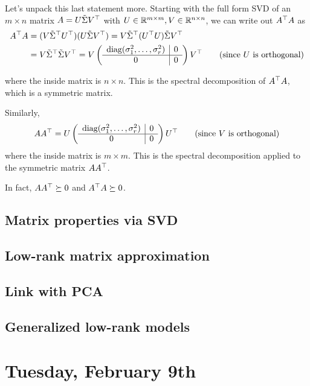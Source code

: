 \documentclass[11 pt]{scrartcl}
\begin{document}
Let's unpack this last statement more. 
Starting with the full form SVD of an $m\times n$ matrix $A = U \tilde{\Sigma} V^\top$ with $U\in \mathbb R^{m\times m}, V\in\mathbb R^{n\times n}$, we can write out $A^\top A$ as 
\begin{align*}
    A^\top A &= (V \tilde{\Sigma}^\top U^\top) (U \tilde{\Sigma} V^\top) =  V \tilde{\Sigma}^\top (U^\top U) \tilde{\Sigma} V^\top \\ 
           &= V\tilde{\Sigma}^\top \tilde{\Sigma} V^\top = V \left(\begin{array}{c|c} \text{diag}(\sigma_1^2, \dots, \sigma_r^2) & 0 \\ \hline 0 & 0 \end{array}\right) V^\top \tag{since $U$ is orthogonal}
\end{align*}

where the inside matrix is $n\times n$. 
This is the spectral decomposition of $A^\top A$, which is a symmetric matrix. 

Similarly, 
\begin{align*}
    A A^\top = U \left(\begin{array}{c|c} \text{diag}(\sigma_1^2, \dots, \sigma_r^2) & 0 \\ \hline 0 & 0 \end{array}\right) U^\top \tag{since $V$ is orthogonal}
\end{align*}
where the inside matrix is $m\times m$. 
This is the spectral decomposition applied to the symmetric matrix $AA^\top$. 

In fact, $AA^\top \succeq 0$ and $A^\top A \succeq 0$.  


\subsection{Matrix properties via SVD}

\subsection{Low-rank matrix approximation}

\subsection{Link with PCA}

\subsection{Generalized low-rank models}



\newpage
\section{Tuesday, February 9th}
\end{document}
